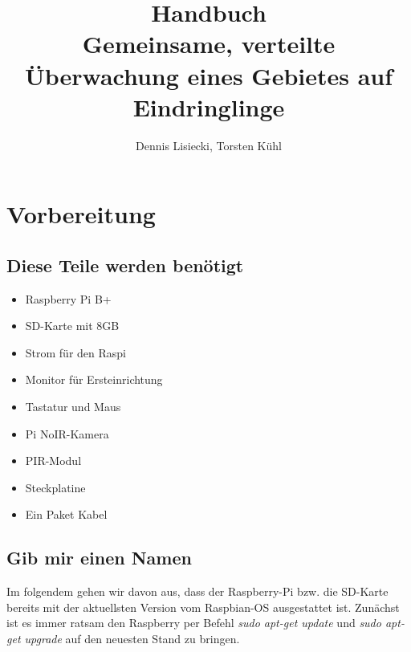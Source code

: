 \documentclass[12pt,a4paper]{scrreprt}
\title{Handbuch \\ Gemeinsame, verteilte Überwachung eines Gebietes auf Eindringlinge}
\author{Dennis Lisiecki, Torsten Kühl}
\begin{document}
\maketitle	%
\tableofcontents	%
\chapter{Vorbereitung}
\section{Diese Teile werden benötigt}
\begin{itemize}
\item Raspberry Pi B+
\item SD-Karte mit 8GB
\item Strom für den Raspi
\item Monitor für Ersteinrichtung
\item Tastatur und Maus
\item Pi NoIR-Kamera
\item PIR-Modul
\item Steckplatine
\item Ein Paket Kabel
\end{itemize}

\section{Gib mir einen Namen}
Im folgendem gehen wir davon aus, dass der Raspberry-Pi bzw. die SD-Karte bereits mit der aktuellsten Version vom Raspbian-OS ausgestattet ist. Zunächst ist es immer ratsam den Raspberry per Befehl \textit{sudo apt-get update} und \textit{sudo apt-get upgrade} auf den neuesten Stand zu bringen.
\end{document}

